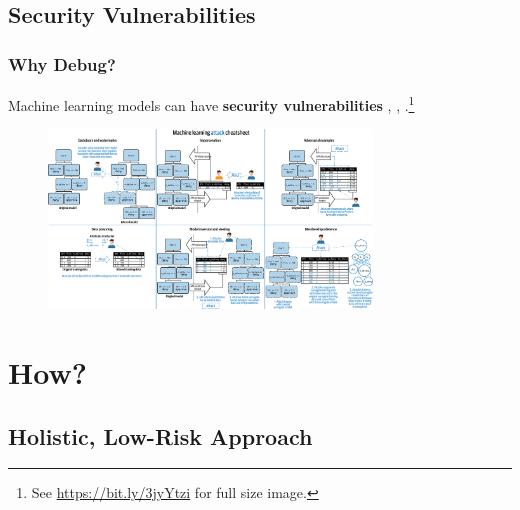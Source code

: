 \documentclass[11pt,
               aspectratio=169,
               hyperref={colorlinks}
               ]{beamer}
\begin{document}
		\subsection{Security Vulnerabilities}
			\begin{frame}[t]
		
				\frametitle{Why Debug?}
		
				\footnotesize{Machine learning models can have \textbf{security vulnerabilities} \cite{security_of_ml}, \cite{membership_inference}, \cite{model_stealing}}.\footnote{\tiny{See \url{https://bit.ly/3jyYtzi} for full size image.}}
				\begin{figure}[]
					\begin{center}
						\includegraphics[height=135pt]{../img/Attack_Cheat_Sheet.png}
					\end{center}
				\end{figure}	
				\vspace{-17pt}
				\normalsize
		
			\end{frame}

	\section{How?}

		\subsection{Holistic, Low-Risk Approach}
	
\end{document}
